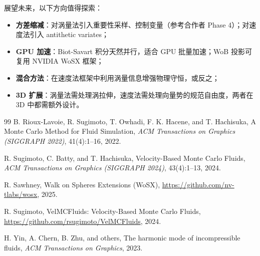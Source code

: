 \documentclass[12pt,a4paper]{article}
\begin{document}
展望未来，以下方向值得探索：
\begin{itemize}
    \item \textbf{方差缩减}：对涡量法引入重要性采样、控制变量（参考合作者 Phase 4）；对速度法引入 antithetic variates；
    \item \textbf{GPU 加速}：Biot-Savart 积分天然并行，适合 GPU 批量加速；WoB 投影可复用 NVIDIA WoSX 框架\cite{sawhney2023wosx}；
    \item \textbf{混合方法}：在速度法框架中利用涡量信息增强物理守恒，或反之；
    \item \textbf{3D 扩展}：涡量法需处理涡拉伸，速度法需处理向量势的规范自由度，两者在 3D 中都需额外设计。
\end{itemize}

\begin{thebibliography}{99}
B. Rioux-Lavoie, R. Sugimoto, T. Owhadi, F. K. Hacene, and T. Hachisuka,
\newblock A Monte Carlo Method for Fluid Simulation,
\newblock \emph{ACM Transactions on Graphics (SIGGRAPH 2022)}, 41(4):1--16, 2022.

R. Sugimoto, C. Batty, and T. Hachisuka,
\newblock Velocity-Based Monte Carlo Fluids,
\newblock \emph{ACM Transactions on Graphics (SIGGRAPH 2024)}, 43(4):1--13, 2024.

R. Sawhney,
\newblock Walk on Spheres Extensions (WoSX),
\newblock \url{https://github.com/nv-tlabs/wosx}, 2025.

R. Sugimoto,
\newblock VelMCFluids: Velocity-Based Monte Carlo Fluids,
\newblock \url{https://github.com/rsugimoto/VelMCFluids}, 2024.

H. Yin, A. Chern, B. Zhu, and others,
\newblock The harmonic mode of incompressible fluids,
\newblock \emph{ACM Transactions on Graphics}, 2023.
\end{thebibliography}
\end{document}
